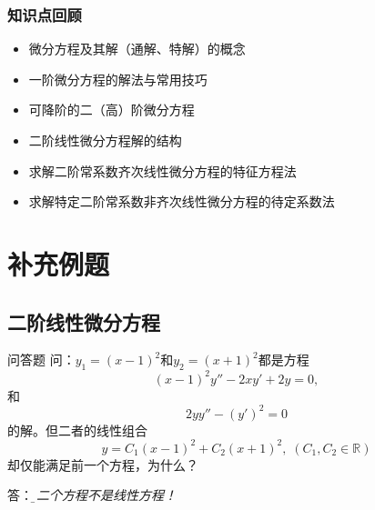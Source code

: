 
\titlepage

\begin{frame}
	\frametitle{知识点回顾}
	\linespread{1.5}
	\it
	  \begin{itemize}
 	    \item 微分方程及其解（通解、特解）的概念
	    \item 一阶微分方程的解法与常用技巧
	    \item 可降阶的二（高）阶微分方程
	    \item 二阶线性微分方程解的结构
	    \item 求解二阶常系数齐次线性微分方程的特征方程法
	    \item 求解特定二阶常系数非齐次线性微分方程的待定系数法
	  \end{itemize}
\end{frame}

\section{补充例题}

\subsection{二阶线性微分方程}


% 	
% 	
% 	

\begin{frame}{问答题}
	\linespread{1.2}
	\alert{问：}$y_1=(x-1)^2$和$y_2=(x+1)^2$都是方程
	$$(x-1)^2y''-2xy'+2y=0,$$
	和
	$$2yy''-(y')^2=0$$
	的解。但二者的线性组合
	$$y=C_1(x-1)^2+C_2(x+1)^2,\;(C_1,C_2\in\mathbb{R})$$
	却仅能满足前一个方程，为什么？\pause 
	
	\alert{答：}{\it\b 第二个方程不是线性方程！}
\end{frame}

